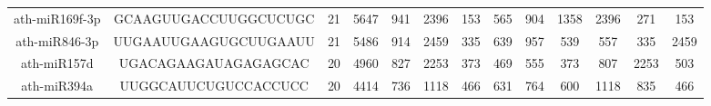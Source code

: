 \begin{landscape}
\begin{table}[]
\begin{tabular}{ccccccccccccc}
    ath-miR169f-3p   & GCAAGUUGACCUUGGCUCUGC    & 21           & 5647         & 941              & 2396         & 153                          & 565                  & 904                  & 1358                  & 2396                  & 271                   & 153                   \\
    ath-miR846-3p    & UUGAAUUGAAGUGCUUGAAUU    & 21           & 5486         & 914              & 2459         & 335                          & 639                  & 957                  & 539                   & 557                   & 335                   & 2459                  \\
    ath-miR157d      & UGACAGAAGAUAGAGAGCAC     & 20           & 4960         & 827              & 2253         & 373                          & 469                  & 555                  & 373                   & 807                   & 2253                  & 503                   \\
    ath-miR394a      & UUGGCAUUCUGUCCACCUCC     & 20           & 4414         & 736              & 1118         & 466                          & 631                  & 764                  & 600                   & 1118                  & 835                   & 466                   
    
    \end{tabular}
    \end{table}
\end{landscape}


